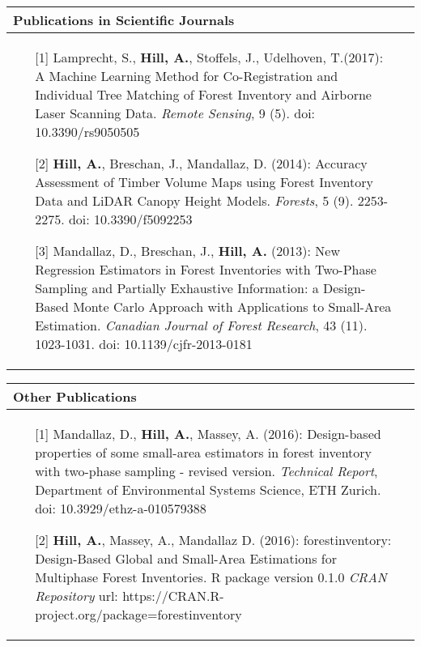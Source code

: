 \noindent
\begin{tabular*}{\textwidth}{p{}p{}}
	\multicolumn{2}{l}{\large Publications in Scientific Journals}\\
	\toprule
\begin{enumerate}[]
	
		\item [{[1]}] Lamprecht, S., \textbf{Hill, A.}, Stoffels, J., Udelhoven, T.(2017): A Machine Learning Method for Co-Registration and Individual Tree Matching of Forest Inventory and Airborne Laser Scanning Data. \textit{Remote Sensing}, 9 (5). doi: 10.3390/rs9050505
		
		\item [{[2]}] \textbf{Hill, A.}, Breschan, J., Mandallaz, D. (2014): Accuracy Assessment of Timber Volume Maps using Forest Inventory Data and LiDAR Canopy Height Models. \textit{Forests}, 5 (9). 2253-2275. doi: 10.3390/f5092253
			
		\item [{[3]}] Mandallaz, D., Breschan, J., \textbf{Hill, A.} (2013): New Regression Estimators in Forest Inventories with Two-Phase Sampling and Partially Exhaustive Information: a Design-Based Monte Carlo Approach with Applications to Small-Area Estimation. \textit{Canadian Journal of Forest Research}, 43 (11). 1023-1031. doi: 10.1139/cjfr-2013-0181
	
\end{enumerate}
	&\\
\end{tabular*}

\noindent
\begin{tabular*}{\textwidth}{p{}p{}}
	\multicolumn{2}{l}{\large Other Publications}\\
	\toprule
	
	\begin{enumerate}[]
		
		\item [{[1]}] Mandallaz, D., \textbf{Hill, A.}, Massey, A. (2016): Design-based properties of some small-area estimators in forest inventory with two-phase sampling - revised version. \textit{Technical Report}, Department of Environmental Systems Science, ETH Zurich. doi: 10.3929/ethz-a-010579388
		
		\item [{[2]}] \textbf{Hill, A.}, Massey, A., Mandallaz D. (2016): forestinventory: Design-Based Global and Small-Area Estimations for Multiphase Forest Inventories. R package version 0.1.0 \textit{CRAN Repository} url: https://CRAN.R-project.org/package=forestinventory

	\end{enumerate}	
	&\\
\end{tabular*}























